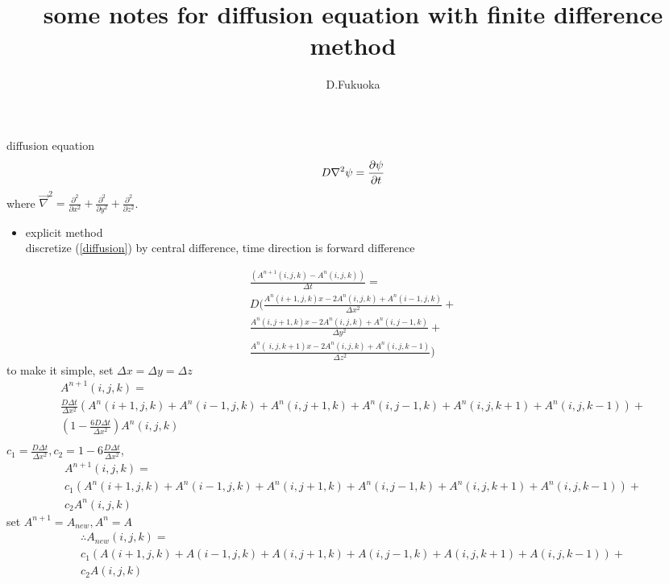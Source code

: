 \documentclass{article}
\title{some notes for diffusion equation with finite difference method}
\author{D.Fukuoka}
\begin{document}
\maketitle
diffusion equation
\begin{equation}
  \label{diffusion}
  D\nabla^2 \psi = \frac{\partial \psi}{\partial t} \\
\end{equation}
where $\vec{\nabla}^2 = \frac{\partial^2}{\partial x^2} + \frac{\partial^2}{\partial y^2} + \frac{\partial^2}{\partial z^2} \nonumber$.
\begin{itemize}
\item explicit method \\
  discretize (\ref{diffusion}) by central difference, time direction is forward difference
\end{itemize}
\begin{multline}
  \frac{(A^{n+1}(i,j,k)-A^n(i,j,k))}{\Delta t} = \\
  D( \frac{A^n(i+1,j,k)x-2A^n(i,j,k)+A^n(i-1,j,k)}{\Delta x^2} + \\
  \frac{A^n(i,j+1,k)x-2A^n(i,j,k)+A^n(i,j-1,k)}{\Delta y^2} + \\
  \frac{A^n(\ i,j,k+1)x-2A^n(i,j,k)+A^n(i,j,k-1)}{\Delta z^2})
\end{multline}
to make it simple, set $\Delta x = \Delta y = \Delta z$
\begin{multline}
  A^{n+1}(i,j,k) = \\
  \frac{D\Delta t}{\Delta x^2}\left (A^n(i+1,j,k)+A^n(i-1,j,k)+A^n(i,j+1,k)+A^n(i,j-1,k)+A^n(i,j,k+1)+A^n(i,j,k-1)\right ) + \\
  \left ( 1-\frac{6D\Delta t}{\Delta x^2}\right )A^n(i,j,k) \\
\end{multline}
$c_1 = \frac{D\Delta t}{\Delta x^2}, c_2 = 1-6\frac{D\Delta t}{\Delta x^2}$,
\begin{multline}
  A^{n+1}(i,j,k) = \\
  c_1\left (A^n(i+1,j,k)+A^n(i-1,j,k)+A^n(i,j+1,k)+A^n(i,j-1,k)+A^n(i,j,k+1)+A^n(i,j,k-1)\right ) + \\
  c_2A^n(i,j,k)
\end{multline}
set $A^{n+1} = A_{new}, A^n = A$
\begin{multline}
  \therefore A_{new}(i,j,k) = \\
  c_1\left (A(i+1,j,k)+A(i-1,j,k)+A(i,j+1,k)+A(i,j-1,k)+A(i,j,k+1)+A(i,j,k-1)\right ) + \\
  c_2A(i,j,k)
\end{multline}
\end{document}

